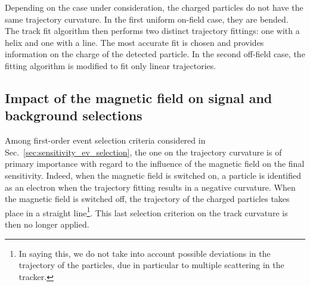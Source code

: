 Depending on the case under consideration, the charged particles do not have the same trajectory curvature.
In the first uniform on-field case, they are bended.
The track fit algorithm then performs two distinct trajectory fittings: one with a helix and one with a line.
The most accurate fit is chosen and provides information on the charge of the detected particle.
In the second off-field case, the fitting algorithm is modified to fit only linear trajectories.

\subsection{Impact of the magnetic field on signal and background selections}
\label{subsec:impact_field}

Among first-order event selection criteria considered in Sec.~\ref{sec:sensitivity_ev_selection}, the one on the trajectory curvature is of primary importance with regard to the influence of the magnetic field on the final sensitivity.
Indeed, when the magnetic field is switched on, a particle is identified as an electron when the trajectory fitting results in a negative curvature.
When the magnetic field is switched off, the trajectory of the charged particles takes place in a straight line\footnote{In saying this, we do not take into account possible deviations in the trajectory of the particles, due in particular to multiple scattering in the tracker.}.
This last selection criterion on the track curvature is then no longer applied.

